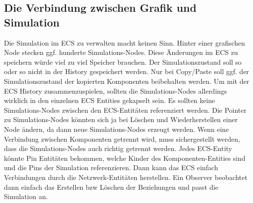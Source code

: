 \documentclass[11pt]{article}
\begin{document}
    \subsection{Die Verbindung zwischen Grafik und Simulation}
    Die Simulation im ECS zu verwalten macht keinen Sinn.
    Hinter einer grafischen Node stecken ggf. hunderte Simulations-Nodes.
    Diese Änderungen im ECS zu speichern würde viel zu viel Speicher brauchen.
    Der Simulationszustand soll so oder so nicht in der History gespeichert werden.
    Nur bei Copy/Paste soll ggf. der Simulationszustand der kopierten Komponenten beibehalten werden.
    Um mit der ECS History zusammenzuspielen, sollten die Simulations-Nodes allerdings wirklich in den einzelnen
    ECS Entities gekapselt sein.
    Es sollten keine Simulations-Nodes zwischen den ECS-Entitäten referenziert werden.
    Die Pointer zu Simulations-Nodes könnten sich ja bei Löschen und Wiederherstellen einer Node ändern, da dann
    neue Simulations-Nodes erzeugt werden.
    Wenn eine Verbindung zwischen Komponenten getrennt wird, muss sichergestellt werden, dass die Simulations-Nodes auch richtig getrennt
    werden.
    Jedes ECS-Entity könnte Pin Entitäten bekommen, welche Kinder des Komponenten-Entities sind und die Pins der Simulation referenzieren.
    Dann kann das ECS einfach Verbindungen durch die Netzwerk-Entitäten herstellen.
    Ein Observer beobachtet dann einfach das Erstellen bzw Löschen der Beziehungen und passt die Simulation an.
    
\end{document}
